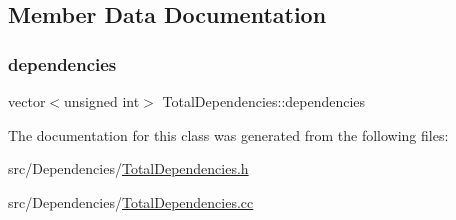 \subsection{Member Data Documentation}
\mbox{\label{classTotalDependencies_a94825b4f782c30dfebf69dd2eba0bb1f}} 
\subsubsection{\texorpdfstring{dependencies}{dependencies}}
{\footnotesize\ttfamily vector$<$unsigned int$>$ Total\+Dependencies\+::dependencies\hspace{0.3cm}{\ttfamily [private]}}



The documentation for this class was generated from the following files\+:\begin{DoxyCompactItemize}
\item 
src/\+Dependencies/\hyperlink{TotalDependencies_8h}{Total\+Dependencies.\+h}\item 
src/\+Dependencies/\hyperlink{TotalDependencies_8cc}{Total\+Dependencies.\+cc}\end{DoxyCompactItemize}
